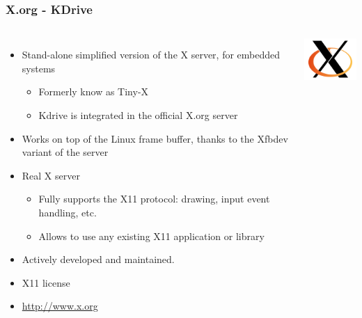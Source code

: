 \begin{frame}
  \frametitle{X.org - KDrive}
  \begin{columns}[T]
    \begin{itemize}
    \item Stand-alone simplified version of the X server, for embedded
      systems
      \begin{itemize}
      \item Formerly know as Tiny-X
      \item Kdrive is integrated in the official X.org server
      \end{itemize}
    \item Works on top of the Linux frame buffer, thanks to the Xfbdev
      variant of the server
    \item Real X server
      \begin{itemize}
      \item Fully supports the X11 protocol: drawing, input event
        handling, etc.
      \item Allows to use any existing X11 application or library
      \end{itemize}
    \item Actively developed and maintained.
    \item X11 license
    \item \url{http://www.x.org}
    \end{itemize}
    \includegraphics[width=\textwidth]{slides/sysdev-embedded-linux/xorg.png}
  \end{columns}
\end{frame}

